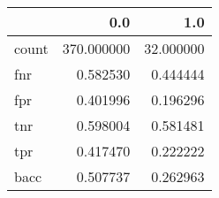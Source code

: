 \begin{tabular}{lrr}
\toprule
{} &         0.0 &        1.0 \\
\midrule
count &  370.000000 &  32.000000 \\
fnr   &    0.582530 &   0.444444 \\
fpr   &    0.401996 &   0.196296 \\
tnr   &    0.598004 &   0.581481 \\
tpr   &    0.417470 &   0.222222 \\
bacc  &    0.507737 &   0.262963 \\
\bottomrule
\end{tabular}
